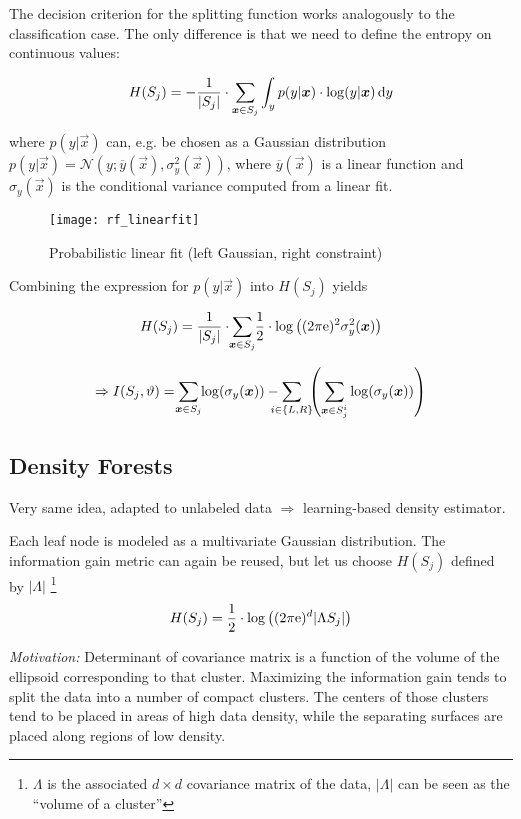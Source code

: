 The decision criterion for the splitting function works analogously to the classification case. The only difference is that we need to define the entropy on continuous values:

\[H(S_j) = -\frac{1}{|S_j|} \cdot \sum_{\bm{x} \in S_j} \int_y p(y|\bm{x}) \cdot \log(y|\bm{x})\mathop{}\!\mathrm{d} y\]

where \(p(y|\vec{x})\) can, e.g. be chosen as a Gaussian distribution \(p(y|\vec{x}) = \mathcal{N}(y; \overline{y}(\vec{x}), \sigma_y^2(\vec{x}))\), where \(\overline{y}(\vec{x})\) is a linear function and \(\sigma_y(\vec{x})\) is the conditional variance computed from a linear fit.

\begin{figure}[H]
	\centering
    \texttt{[image: rf\_linearfit]}
    \caption[Probabilistic linear fit]{Probabilistic linear fit (left Gaussian, right constraint)}
\end{figure}

Combining the expression for \(p(y|\vec{x})\) into \(H(S_j)\) yields

\[H(S_j) = \frac{1}{|S_j|} \cdot \sum_{\mathclap{\vec{x} \in S_j}} \frac{1}{2} \cdot \log\left((2 \pi\euler)^2 \sigma_y^2(\vec{x})\right)\]

\[\Rightarrow I(S_j, \vartheta) = \sum_{\mathclap{\vec{x} \in S_j}} \log(\sigma_y(\vec{x})) - \sum_{\mathclap{i \in \{L, R\}}}\  \left(\sum_{\vec{x} \in S_j^i} \log (\sigma_y(\vec{x}))\right) \]

\subsection{Density Forests}
Very same idea, adapted to unlabeled data $\Rightarrow$ learning-based density estimator.

Each leaf node is modeled as a multivariate Gaussian distribution. The information gain metric can again be reused, but let us choose \(H(S_j)\) defined by $|\Lambda|$ \footnote{$\Lambda$ is the associated $d \times d$ covariance matrix of the data, $|\Lambda|$  can be seen as the ``volume of a cluster''}
\[
  H(S_j) = \frac{1}{2} \cdot \log\left((2 \pi\mathrm{e})^d |\Lambda S_j|\right)
\]

\textit{Motivation:}
Determinant of covariance matrix is a function of the volume of the ellipsoid corresponding to that cluster. Maximizing the information gain tends to split the data into a number of compact clusters. The centers of those clusters tend to be placed in areas of high data density, while the separating surfaces are placed along regions of low density.\\

